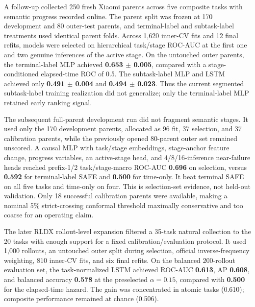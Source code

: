 \documentclass[11pt,a4paper]{article}
\newcommand{\metric}[1]{\textbf{#1}}
\begin{document}
A follow-up collected 250 fresh Xiaomi parents across five composite tasks with semantic progress recorded online. The parent split was frozen at 170 development and 80 outer-test parents, and terminal-label and subtask-label treatments used identical parent folds. Across 1,620 inner-CV fits and 12 final refits, models were selected on hierarchical task/stage ROC-AUC at the first one and two genuine inferences of the active stage. On the untouched outer parents, the terminal-label MLP achieved \metric{0.653 $\pm$ 0.005}, compared with a stage-conditioned elapsed-time ROC of 0.5. The subtask-label MLP and LSTM achieved only \metric{0.491 $\pm$ 0.004} and \metric{0.494 $\pm$ 0.023}. Thus the current segmented subtask-label training realization did not generalize; only the terminal-label MLP retained early ranking signal.

The subsequent full-parent development run did not fragment semantic stages.
It used only the 170 development parents, allocated as 96 fit, 37 selection,
and 37 calibration parents, while the previously opened 80-parent outer set
remained unscored. A causal MLP with task/stage embeddings, stage-anchor
feature change, progress variables, an active-stage head, and 4/8/16-inference
near-failure heads reached prefix-1/2 task/stage-macro ROC-AUC
\metric{0.696} on selection, versus \metric{0.592} for terminal-label SAFE
and \metric{0.500} for time-only. It beat terminal SAFE on all five tasks and
time-only on four. This is selection-set evidence, not held-out validation.
Only 18 successful calibration parents were available, making a nominal 5\%
strict-crossing conformal threshold maximally conservative and too coarse for
an operating claim.

The later RLDX rollout-level expansion filtered a 35-task natural collection to the 20 tasks with enough support for a fixed calibration/evaluation protocol. It used 1,000 rollouts, an untouched outer split during selection, official inverse-frequency weighting, 810 inner-CV fits, and six final refits. On the balanced 200-rollout evaluation set, the task-normalized LSTM achieved ROC-AUC \metric{0.613}, AP \metric{0.608}, and balanced accuracy \metric{0.578} at the preselected $\alpha=0.15$, compared with \metric{0.500} for the elapsed-time hazard. The gain was concentrated in atomic tasks (0.610); composite performance remained at chance (0.506).
\end{document}
